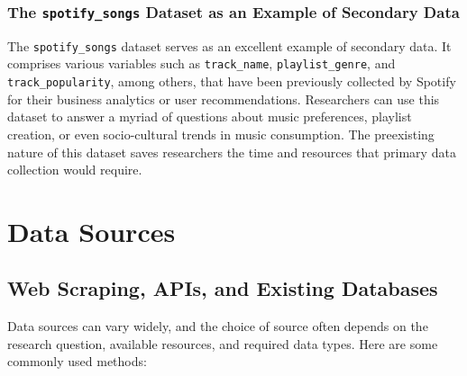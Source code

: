 \documentclass[
]{book}
\begin{document}
\hypertarget{the-spotify_songs-dataset-as-an-example-of-secondary-data}{%
\subsubsection*{\texorpdfstring{The \texttt{spotify\_songs} Dataset as an Example of Secondary Data}{The spotify\_songs Dataset as an Example of Secondary Data}}\label{the-spotify_songs-dataset-as-an-example-of-secondary-data}}

The \texttt{spotify\_songs} dataset serves as an excellent example of secondary data. It comprises various variables such as \texttt{track\_name}, \texttt{playlist\_genre}, and \texttt{track\_popularity}, among others, that have been previously collected by Spotify for their business analytics or user recommendations. Researchers can use this dataset to answer a myriad of questions about music preferences, playlist creation, or even socio-cultural trends in music consumption. The preexisting nature of this dataset saves researchers the time and resources that primary data collection would require.

\hypertarget{data-sources}{%
\section{Data Sources}\label{data-sources}}

\hypertarget{web-scraping-apis-and-existing-databases}{%
\subsection*{Web Scraping, APIs, and Existing Databases}\label{web-scraping-apis-and-existing-databases}}

Data sources can vary widely, and the choice of source often depends on the research question, available resources, and required data types. Here are some commonly used methods:
\end{document}
